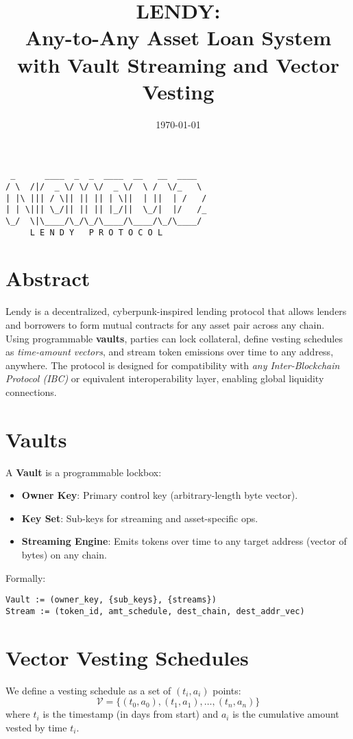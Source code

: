 \documentclass[11pt]{article}
\title{\huge\bfseries LENDY:\\Any-to-Any Asset Loan System with Vault Streaming and Vector Vesting}
\author{}
\date{\today}
\begin{document}
\maketitle

\begin{verbatim}
 _      ____  _  _  ____  __   __  ____ 
/ \  /|/  _ \/ \/ \/  _ \/  \ /  \/_   \
| |\ ||| / \|| || || | \||  | ||  | /   /
| | \||| \_/|| || || |_/||  \_/|  |/   /_
\_/  \|\____/\_/\_/\____/\____/\_/\____/
     L E N D Y   P R O T O C O L
\end{verbatim}

\section*{Abstract}
Lendy is a decentralized, cyberpunk-inspired lending protocol that allows lenders and borrowers to form mutual contracts for any asset pair across any chain. Using programmable \textbf{vaults}, parties can lock collateral, define vesting schedules as \emph{time-amount vectors}, and stream token emissions over time to any address, anywhere. The protocol is designed for compatibility with \emph{any Inter-Blockchain Protocol (IBC)} or equivalent interoperability layer, enabling global liquidity connections.

\section{Vaults}
A \textbf{Vault} is a programmable lockbox:
\begin{itemize}[leftmargin=1.5em]
    \item \textbf{Owner Key}: Primary control key (arbitrary-length byte vector).
    \item \textbf{Key Set}: Sub-keys for streaming and asset-specific ops.
    \item \textbf{Streaming Engine}: Emits tokens over time to any target address (vector of bytes) on any chain.
\end{itemize}

Formally:
\begin{verbatim}
Vault := (owner_key, {sub_keys}, {streams})
Stream := (token_id, amt_schedule, dest_chain, dest_addr_vec)
\end{verbatim}

\section{Vector Vesting Schedules}
We define a vesting schedule as a set of $(t_i, a_i)$ points:
\begin{equation}
\mathcal{V} = \{ (t_0, a_0), (t_1, a_1), \dots, (t_n, a_n) \}
\end{equation}
where $t_i$ is the timestamp (in days from start) and $a_i$ is the cumulative amount vested by time $t_i$.
\end{document}
